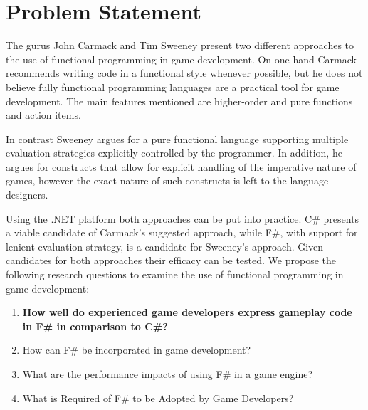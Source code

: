 \section{Problem Statement} \label{sec:problem_statement}
The gurus John Carmack and Tim Sweeney present two different approaches to the use of functional programming in game development. On one hand Carmack recommends writing code in a functional style whenever possible, but he does not believe fully functional programming languages are a practical tool for game development. The main features mentioned are higher-order and pure functions and action items.

In contrast Sweeney argues for a pure functional language supporting multiple evaluation strategies explicitly controlled by the programmer. In addition, he argues for constructs that allow for explicit handling of the imperative nature of games, however the exact nature of such constructs is left to the language designers.

Using the .NET platform both approaches can be put into practice. C\# presents a viable candidate of Carmack's suggested approach, while F\#, with support for lenient evaluation strategy, is a candidate for Sweeney's approach. Given candidates for both approaches their efficacy can be tested. We propose the following research questions to examine the use of functional programming in game development:

\begin{center}
    \begin{enumerate}
        \item \textbf{How well do experienced game developers express gameplay code in F\# in comparison to C\#?}
        \item How can F\# be incorporated in game development?
        \item What are the performance impacts of using F\# in a game engine?
        \item What is Required of F\# to be Adopted by Game Developers?
    \end{enumerate}
\end{center}
